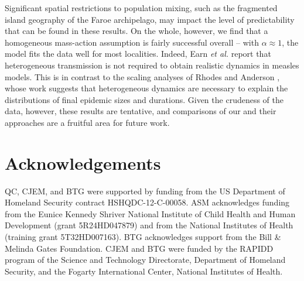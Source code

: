 \documentclass[10pt]{article}
\begin{document}
Significant spatial restrictions to population mixing, such as the fragmented island geography of the Faroe archipelago, may impact the level of predictability that can be found in these results. On the whole, however, we find that a homogeneous mass-action assumption is fairly successful overall -- with $\alpha \approx 1$, the model fits the data well for most localities. Indeed, Earn \textit{et al.} \cite{Earn2000} report that heterogeneous transmission is not required to obtain realistic dynamics in measles models. This is in contrast to the scaling analyses of Rhodes and Anderson \cite{Rhodes1996a, Rhodes1996b}, whose work suggests that heterogeneous dynamics are necessary to explain the distributions of final epidemic sizes and durations. Given the crudeness of the data, however, these results are tentative, and comparisons of our and their approaches are a fruitful area for future work.
























\section*{Acknowledgements}

QC, CJEM, and BTG were supported by funding from the US Department of Homeland Security contract HSHQDC-12-C-00058. ASM acknowledges funding from the Eunice Kennedy Shriver National Institute of Child Health and Human Development (grant 5R24HD047879) and from the National Institutes of Health (training grant 5T32HD007163). BTG acknowledges support from the Bill \& Melinda Gates Foundation. CJEM and BTG were funded by the RAPIDD program of the Science and Technology Directorate, Department of Homeland Security, and the Fogarty International Center, National Institutes of Health. 









\end{document}
